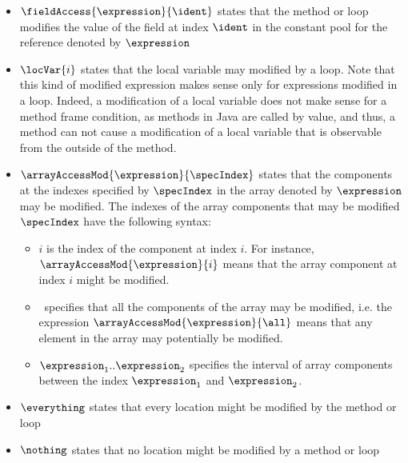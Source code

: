 \begin{itemize}
      \item  $ \fieldAccess{\expression}{\ident} $ states that the method or loop modifies the value of the field at index $\ident$ 
             in the constant pool for the reference denoted by  $\expression$ 
      \item $\locVar{i}$ states that the local variable may modified by a loop. Note that this kind of modified
            expression makes sense only for expressions modified in a loop.
	    Indeed, a modification of a local variable does not make sense for a method frame condition, 
	    as methods in Java are called by value, and
	    thus, a method can not cause a modification of a local variable that is observable from the outside of the method.
	    
      \item  $\arrayAccessMod{\expression}{\specIndex}$ states that the components at the indexes specified by $\specIndex$ in
            the array denoted by $\expression$ may be modified. The indexes of the array components that may be modified $\specIndex$
	    have the following syntax:
	    \begin{itemize}
	          \item $i$ is the index of the component at index $i$. For instance, 
		        $\arrayAccessMod{\expression}{i}$ means that the array component at index $i$ might be modified.
	          \item \all \ specifies that all the components of the array may be modified, i.e. the expression 
		         $\arrayAccessMod{\expression}{\all}$ means that any element in the array may potentially be modified.
		       
		  \item $ \expression_1 .. \expression_2$ specifies the interval of array components between the index $\expression_1$  and $\expression_2$.  
			 
	    \end{itemize}

      \item $\everything $ states that every location might be modified by the method or loop
      \item $\nothing$ states that no location might be modified by a method or loop
\end{itemize}


